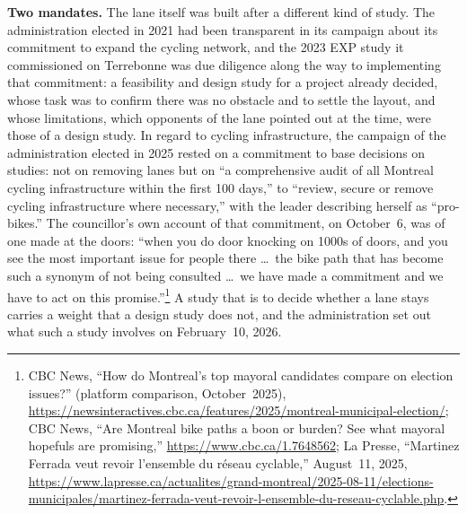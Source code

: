\documentclass[11pt,letterpaper]{article}
\begin{document}
\textbf{Two mandates.} The lane itself was built after a different kind of
study. The administration elected in 2021 had been transparent in its
campaign about its commitment to expand the cycling network, and the 2023
EXP study it commissioned on Terrebonne was due diligence along the way to
implementing that commitment: a feasibility and design study for a project
already decided, whose task was to confirm there was no obstacle and to
settle the layout, and whose limitations, which opponents of the lane
pointed out at the time, were those of a design study. In regard to
cycling infrastructure, the campaign of the administration elected in 2025
rested on a commitment to base decisions on studies: not on removing
lanes but on ``a comprehensive audit of all Montreal cycling
infrastructure within the first 100 days,'' to ``review, secure or remove
cycling infrastructure where necessary,'' with the leader describing
herself as ``pro-bikes.'' The councillor's own account of that
commitment, on October~6, was of one made at the doors: ``when you do door
knocking on 1000s of doors, and you see the most important issue for
people there \ldots\ the bike path that has become such a synonym of not
being consulted \ldots\ we have made a commitment and we have to act on
this promise.''\footnote{CBC News, ``How
do Montreal's top mayoral candidates compare on election issues?''
(platform comparison, October~2025),
\url{https://newsinteractives.cbc.ca/features/2025/montreal-municipal-election/};
CBC News, ``Are Montreal bike paths a boon or burden? See what mayoral
hopefuls are promising,'' \url{https://www.cbc.ca/1.7648562}; La Presse,
``Martinez Ferrada veut revoir l'ensemble du r\'eseau cyclable,''
August~11, 2025,
\url{https://www.lapresse.ca/actualites/grand-montreal/2025-08-11/elections-municipales/martinez-ferrada-veut-revoir-l-ensemble-du-reseau-cyclable.php}.}
A study that is to decide whether a lane stays carries a weight that a
design study does not, and the administration set out what such a study
involves on February~10, 2026.
\end{document}
